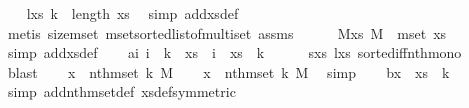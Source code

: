 \begin{isabellebody}
\ \ \isamarkupfalse%
\ l{\isacharunderscore}{\kern0pt}xs{\isacharcolon}{\kern0pt}\ {\isachardoublequoteopen}k\ {\isacharless}{\kern0pt}\ length\ xs{\isachardoublequoteclose}\ \isamarkupfalse%
\ {\isacharparenleft}{\kern0pt}simp\ add{\isacharcolon}{\kern0pt}xs{\isacharunderscore}{\kern0pt}def{\isacharparenright}{\kern0pt}\ \isanewline
\ \ \ \ \isamarkupfalse%
\ {\isacharparenleft}{\kern0pt}metis\ size{\isacharunderscore}{\kern0pt}mset\ mset{\isacharunderscore}{\kern0pt}sorted{\isacharunderscore}{\kern0pt}list{\isacharunderscore}{\kern0pt}of{\isacharunderscore}{\kern0pt}multiset\ assms{\isacharparenleft}{\kern0pt}{}{\isacharparenright}{\kern0pt}{\isacharparenright}{\kern0pt}\ \ \isanewline
\ \ \isamarkupfalse%
\ M{\isacharunderscore}{\kern0pt}xs{\isacharcolon}{\kern0pt}\ {\isachardoublequoteopen}M\ {\isacharequal}{\kern0pt}\ mset\ xs{\isachardoublequoteclose}\ \isamarkupfalse%
\ {\isacharparenleft}{\kern0pt}simp\ add{\isacharcolon}{\kern0pt}xs{\isacharunderscore}{\kern0pt}def{\isacharparenright}{\kern0pt}\isanewline
\ \ \isamarkupfalse%
\ a{\isacharcolon}{\kern0pt}{\isachardoublequoteopen}{\isasymAnd}i{\isachardot}{\kern0pt}\ i\ {\isasymle}\ k\ {\isasymLongrightarrow}\ xs\ {\isacharbang}{\kern0pt}\ i\ {\isasymle}\ xs\ {\isacharbang}{\kern0pt}\ k{\isachardoublequoteclose}\isanewline
\ \ \ \ \isamarkupfalse%
\ s{\isacharunderscore}{\kern0pt}xs\ l{\isacharunderscore}{\kern0pt}xs\ sorted{\isacharunderscore}{\kern0pt}iff{\isacharunderscore}{\kern0pt}nth{\isacharunderscore}{\kern0pt}mono\ \isamarkupfalse%
\ blast\isanewline
\isanewline
\ \ \isamarkupfalse%
\ {\isachardoublequoteopen}{\isasymnot}{\isacharparenleft}{\kern0pt}x\ {\isacharless}{\kern0pt}\ nth{\isacharunderscore}{\kern0pt}mset\ k\ M{\isacharparenright}{\kern0pt}{\isachardoublequoteclose}\isanewline
\ \ \isamarkupfalse%
\ {\isachardoublequoteopen}x\ {\isasymge}\ nth{\isacharunderscore}{\kern0pt}mset\ k\ M{\isachardoublequoteclose}\ \isamarkupfalse%
\ simp\isanewline
\ \ \isamarkupfalse%
\ b{\isacharcolon}{\kern0pt}{\isachardoublequoteopen}x\ {\isasymge}\ xs\ {\isacharbang}{\kern0pt}\ k{\isachardoublequoteclose}\ \isamarkupfalse%
\ {\isacharparenleft}{\kern0pt}simp\ add{\isacharcolon}{\kern0pt}nth{\isacharunderscore}{\kern0pt}mset{\isacharunderscore}{\kern0pt}def\ xs{\isacharunderscore}{\kern0pt}def{\isacharbrackleft}{\kern0pt}symmetric{\isacharbrackright}{\kern0pt}{\isacharparenright}{\kern0pt}\isanewline

\end{isabellebody}
